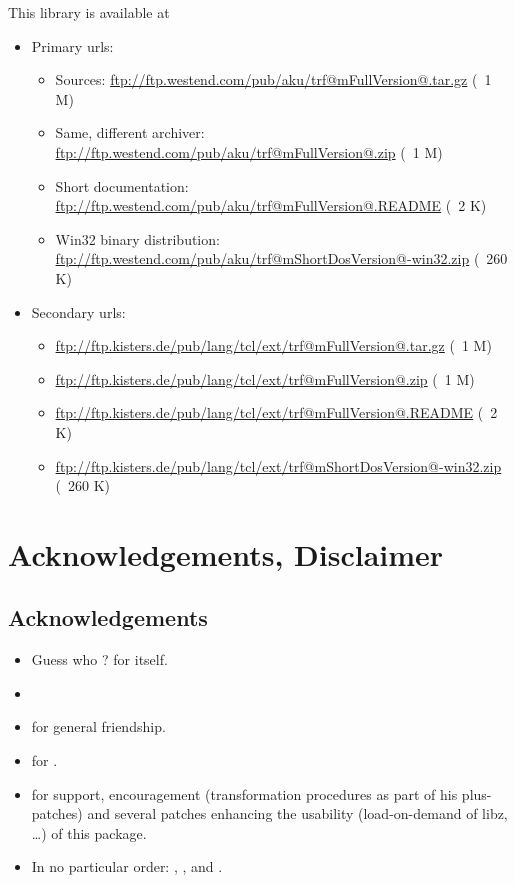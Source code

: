 \documentclass {report}
\begin{document}
This library is available at
\begin {itemize}
\item[] Primary urls:
\begin {itemize}
\item[Sources:]			  \url {ftp://ftp.westend.com/pub/aku/trf@mFullVersion@.tar.gz} (~1 M)
\item[Same, different archiver:]  \url {ftp://ftp.westend.com/pub/aku/trf@mFullVersion@.zip}    (~1 M)
\item[Short documentation:]	  \url {ftp://ftp.westend.com/pub/aku/trf@mFullVersion@.README} (~2 K)
\item[Win32 binary distribution:] \url {ftp://ftp.westend.com/pub/aku/trf@mShortDosVersion@-win32.zip} (~260 K)
\end {itemize}

\item[] Secondary urls:
\begin {itemize}
	\item \url {ftp://ftp.kisters.de/pub/lang/tcl/ext/trf@mFullVersion@.tar.gz} (~1 M)
	\item \url {ftp://ftp.kisters.de/pub/lang/tcl/ext/trf@mFullVersion@.zip}    (~1 M)
	\item \url {ftp://ftp.kisters.de/pub/lang/tcl/ext/trf@mFullVersion@.README} (~2 K)
	\item \url {ftp://ftp.kisters.de/pub/lang/tcl/ext/trf@mShortDosVersion@-win32.zip} (~260 K)
\end {itemize}
\end {itemize}


\chapter {Acknowledgements, Disclaimer}

\section {Acknowledgements}
\begin {itemize}\Large
\item	Guess who ? \jo{} for \tcl {} itself. 
\item	\jyl
\item	\bast{} for general friendship.
\item	\greyham{} for .
\item	\jan{} for support, encouragement
	(transformation procedures as part of his plus-patches) and
	several patches enhancing the usability (load-on-demand of
	libz, \dots{}) of this package.
\item	In no particular order: \gookkimn{}, \rvaldez{}, \gvvaughan{}
	and \fmeyer{}.
\end   {itemize}
\end{document}
